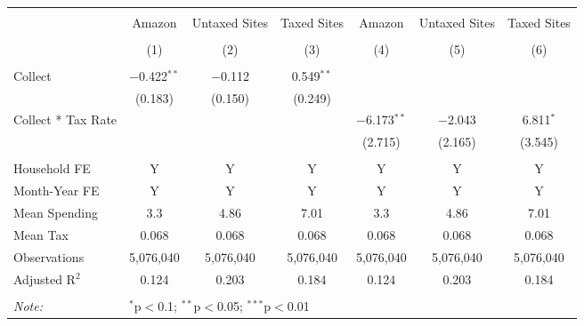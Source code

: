 
\begin{table}[!htbp] \centering 
  \caption{} 
  \label{} 
\begin{tabular}{@{\extracolsep{5pt}}lcccccc} 
\\[-1.8ex]\hline 
\hline \\[-1.8ex] 
 & Amazon & Untaxed Sites & Taxed Sites & Amazon & Untaxed Sites & Taxed Sites \\ 
\\[-1.8ex] & (1) & (2) & (3) & (4) & (5) & (6)\\ 
\hline \\[-1.8ex] 
 Collect & $-$0.422$^{**}$ & $-$0.112 & 0.549$^{**}$ &  &  &  \\ 
  & (0.183) & (0.150) & (0.249) &  &  &  \\ 
  Collect * Tax Rate &  &  &  & $-$6.173$^{**}$ & $-$2.043 & 6.811$^{*}$ \\ 
  &  &  &  & (2.715) & (2.165) & (3.545) \\ 
 \hline \\[-1.8ex] 
Household FE & Y & Y & Y & Y & Y & Y \\ 
Month-Year FE & Y & Y & Y & Y & Y & Y \\ 
Mean Spending & 3.3 & 4.86 & 7.01 & 3.3 & 4.86 & 7.01 \\ 
Mean Tax & 0.068 & 0.068 & 0.068 & 0.068 & 0.068 & 0.068 \\ 
Observations & 5,076,040 & 5,076,040 & 5,076,040 & 5,076,040 & 5,076,040 & 5,076,040 \\ 
Adjusted R$^{2}$ & 0.124 & 0.203 & 0.184 & 0.124 & 0.203 & 0.184 \\ 
\hline 
\hline \\[-1.8ex] 
\textit{Note:}  & \multicolumn{6}{l}{$^{*}$p$<$0.1; $^{**}$p$<$0.05; $^{***}$p$<$0.01} \\ 
\end{tabular} 
\end{table} 
